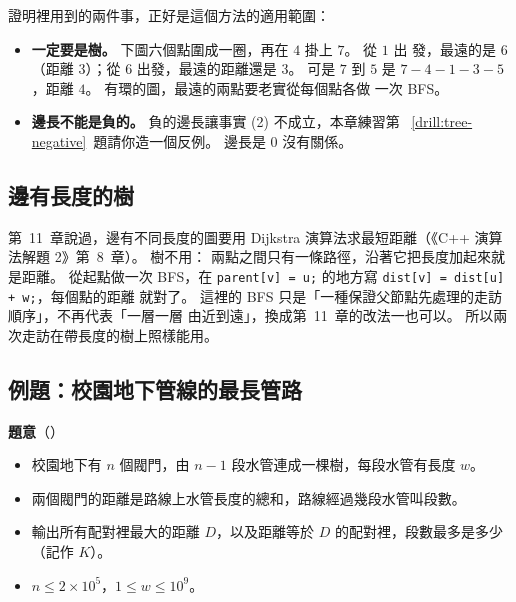 證明裡用到的兩件事，正好是這個方法的適用範圍：

\begin{itemize}
\item \textbf{一定要是樹。} 下圖六個點圍成一圈，再在 $4$ 掛上 $7$。 從 $1$ 出
發，最遠的是 $6$（距離 $3$）；從 $6$ 出發，最遠的距離還是 $3$。 可是 $7$ 到
$5$ 是 $7 - 4 - 1 - 3 - 5$，距離 $4$。 有環的圖，最遠的兩點要老實從每個點各做
一次 BFS。
\item \textbf{邊長不能是負的。} 負的邊長讓事實 (2) 不成立，本章練習第
~\ref{drill:tree-negative}~題請你造一個反例。 邊長是 $0$ 沒有關係。
\end{itemize}

\begin{center}
\label{fig:tree-cycle-cex}
\end{center}

\subsection{邊有長度的樹}

第~11~章說過，邊有不同長度的圖要用 Dijkstra 演算法求最短距離（《C++ 演算法解題 2》第~8~章）。 樹不用：
兩點之間只有一條路徑，沿著它把長度加起來就是距離。 從起點做一次 BFS，在
\texttt{parent[v] = u;} 的地方寫 \texttt{dist[v] = dist[u] + w;}，每個點的距離
就對了。 這裡的 BFS 只是「一種保證父節點先處理的走訪順序」，不再代表「一層一層
由近到遠」，換成第~11~章的改法一也可以。 所以兩次走訪在帶長度的樹上照樣能用。

\subsection{例題：校園地下管線的最長管路}
\label{sec:ex-pipes}

\textbf{題意}（）

\begin{itemize}
\item 校園地下有 $n$ 個閥門，由 $n - 1$ 段水管連成一棵樹，每段水管有長度 $w$。
\item 兩個閥門的距離是路線上水管長度的總和，路線經過幾段水管叫段數。
\item 輸出所有配對裡最大的距離 $D$，以及距離等於 $D$ 的配對裡，段數最多是多少
（記作 $K$）。
\item $n \le 2 \times 10^5$，$1 \le w \le 10^9$。
\end{itemize}

